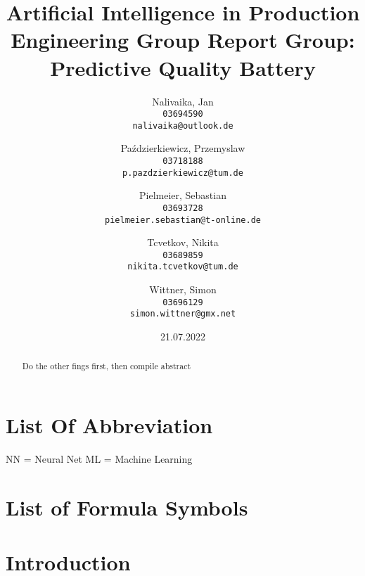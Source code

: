 \documentclass[12pt]{report}
\title{Artificial Intelligence in Production Engineering \linebreak \linebreak Group Report \linebreak Group: Predictive Quality Battery}
\author{Nalivaika, Jan\\
	\texttt{03694590}\\
	\texttt{nalivaika@outlook.de}
	\and
	Paździerkiewicz, Przemyslaw\\
	\texttt{03718188}\\
	\texttt{p.pazdzierkiewicz@tum.de}
	\and
	Pielmeier, Sebastian\\
	\texttt{03693728}\\
	\texttt{pielmeier.sebastian@t-online.de}
	\and
	Tcvetkov, Nikita\\
	\texttt{03689859}\\
	\texttt{nikita.tcvetkov@tum.de}
	\and
	Wittner, Simon\\
	\texttt{03696129}\\
	\texttt{simon.wittner@gmx.net}
}
\date{21.07.2022}
\begin{document}
\maketitle
\begin{abstract}
	Do the other fings first, then compile abstract
\end{abstract}

\tableofcontents
\renewcommand{\thechapter}{\Roman{chapter}}
\chapter{List Of Abbreviation}
NN = Neural Net \newline
ML = Machine Learning 
\chapter{List of Formula Symbols}

\listoffigures
\listoftables

\setcounter{chapter}{0}
\renewcommand{\thechapter}{\arabic{chapter}}
\chapter{Introduction}
\end{document}

